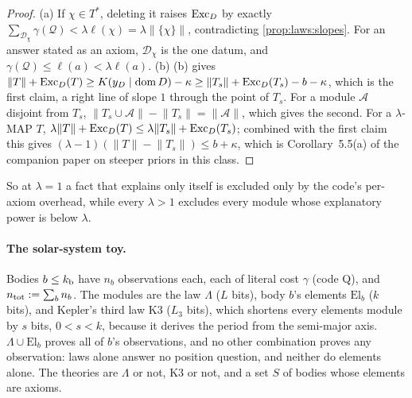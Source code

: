 \begin{proof}
(a) If $\chi\in T^*$, deleting it raises $\mathrm{Exc}_D$ by exactly $\sum_{\mathcal D_\chi}\gamma(\mathcal Q)<\lambda\ell(\chi)=\lambda\lVert\{\chi\}\rVert$, contradicting \cref{prop:laws:slopes}. For an answer stated as an axiom, $\mathcal D_\chi$ is the one datum, and $\gamma(\mathcal Q)\le\ell(a)<\lambda\ell(a)$. (b) (b) gives $\lVert T\rVert+\mathrm{Exc}_D(T)\ge K(y_D\mid\operatorname{dom} D)-\kappa\ge\lVert T_s\rVert+\mathrm{Exc}_D(T_s)-b-\kappa$, which is the first claim, a right line of slope $1$ through the point of $T_s$. For a module $\mathcal A$ disjoint from $T_s$, $\lVert T_s\cup\mathcal A\rVert-\lVert T_s\rVert=\lVert\mathcal A\rVert$, which gives the second. For a $\lambda$-MAP $T$, $\lambda\lVert T\rVert+\mathrm{Exc}_D(T)\le\lambda\lVert T_s\rVert+\mathrm{Exc}_D(T_s)$; combined with the first claim this gives $(\lambda-1)(\lVert T\rVert-\lVert T_s\rVert)\le b+\kappa$, which is Corollary~5.5(a) of the companion paper on steeper priors in this class.
\end{proof}

So at $\lambda=1$ a fact that explains only itself is excluded only by the code's per-axiom overhead, while every $\lambda>1$ excludes every module whose explanatory power is below $\lambda$.

\paragraph{The solar-system toy.} Bodies $b\le k_{\rm b}$ have $n_b$ observations each, each of literal cost $\gamma$ (code Q), and $n_{\rm tot}:=\sum_bn_b$. The modules are the law $\Lambda$ ($L$ bits), body $b$'s elements $\mathrm{El}_b$ ($k$ bits), and Kepler's third law $\mathrm{K3}$ ($L_3$ bits), which shortens every elements module by $s$ bits, $0<s<k$, because it derives the period from the semi-major axis. $\Lambda\cup\mathrm{El}_b$ proves all of $b$'s observations, and no other combination proves any observation: laws alone answer no position question, and neither do elements alone. The theories are $\Lambda$ or not, $\mathrm{K3}$ or not, and a set $S$ of bodies whose elements are axioms.

